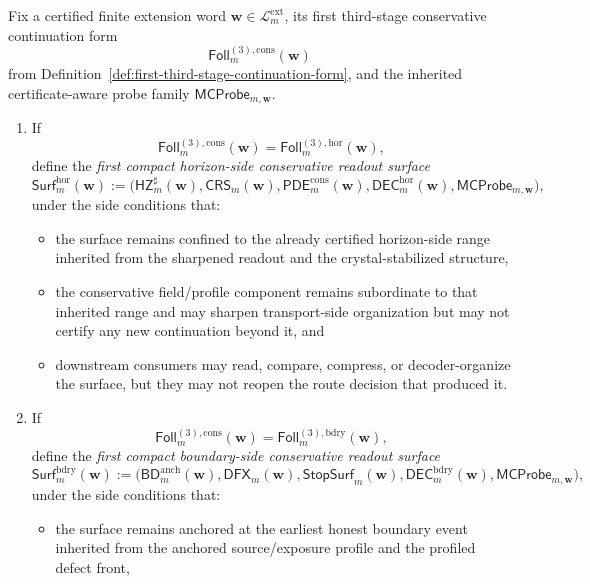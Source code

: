 \begin{definition}
\label{def:first-compact-conservative-readout-surface}
Fix a certified finite extension word \(\mathbf w\in\mathcal L^{\mathrm{ext}}_{m}\), its first third-stage conservative continuation form
\[
 \mathsf{Foll}^{(3),\mathrm{cons}}_{m}(\mathbf w)
\]
from Definition~\ref{def:first-third-stage-continuation-form}, and the inherited certificate-aware probe family \(\mathsf{MCProbe}_{m,\mathbf w}\).
\begin{enumerate}[label=(\roman*)]
 \item If
 \[
 \mathsf{Foll}^{(3),\mathrm{cons}}_{m}(\mathbf w)=\mathsf{Foll}^{(3),\mathrm{hor}}_{m}(\mathbf w),
 \]
 define the \emph{first compact horizon-side conservative readout surface}
 \[
 \mathsf{Surf}^{\mathrm{hor}}_{m}(\mathbf w)
 :=
 \bigl(\mathsf{HZ}^{\sharp}_{m}(\mathbf w),\mathsf{CRS}_{m}(\mathbf w),\mathsf{PDE}^{\mathrm{cons}}_{m}(\mathbf w),\mathsf{DEC}^{\mathrm{hor}}_{m}(\mathbf w),\mathsf{MCProbe}_{m,\mathbf w}\bigr),
 \]
 under the side conditions that:
 \begin{itemize}[leftmargin=2em]
 \item the surface remains confined to the already certified horizon-side range inherited from the sharpened readout and the crystal-stabilized structure,
 \item the conservative field/profile component remains subordinate to that inherited range and may sharpen transport-side organization but may not certify any new continuation beyond it, and
 \item downstream consumers may read, compare, compress, or decoder-organize the surface, but they may not reopen the route decision that produced it.
 \end{itemize}
 \item If
 \[
 \mathsf{Foll}^{(3),\mathrm{cons}}_{m}(\mathbf w)=\mathsf{Foll}^{(3),\mathrm{bdry}}_{m}(\mathbf w),
 \]
 define the \emph{first compact boundary-side conservative readout surface}
 \[
 \mathsf{Surf}^{\mathrm{bdry}}_{m}(\mathbf w)
 :=
 \bigl(\mathsf{BD}^{\mathrm{anch}}_{m}(\mathbf w),\mathsf{DFX}_{m}(\mathbf w),\mathsf{StopSurf}_{m}(\mathbf w),\mathsf{DEC}^{\mathrm{bdry}}_{m}(\mathbf w),\mathsf{MCProbe}_{m,\mathbf w}\bigr),
 \]
 under the side conditions that:
 \begin{itemize}[leftmargin=2em]
 \item the surface remains anchored at the earliest honest boundary event inherited from the anchored source/exposure profile and the profiled defect front,

\end{itemize}
\end{enumerate}
\end{definition}
